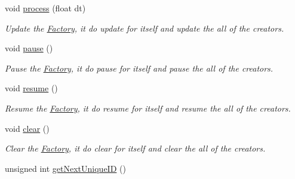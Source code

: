 \begin{DoxyCompactItemize}
\item 
void \hyperlink{class_magnum_1_1_entity_1_1_factory_a274df9f8d7d6f532cbd510a93b5a8445}{process} (float dt)
\begin{DoxyCompactList}\small\item\em Update the \hyperlink{class_magnum_1_1_entity_1_1_factory}{Factory}, it do update for itself and update the all of the creators. \end{DoxyCompactList}\item 
void \hyperlink{class_magnum_1_1_entity_1_1_factory_a5800621a1cfcab4ab08d837bec711e5a}{pause} ()\hypertarget{class_magnum_1_1_entity_1_1_factory_a5800621a1cfcab4ab08d837bec711e5a}{}\label{class_magnum_1_1_entity_1_1_factory_a5800621a1cfcab4ab08d837bec711e5a}

\begin{DoxyCompactList}\small\item\em Pause the \hyperlink{class_magnum_1_1_entity_1_1_factory}{Factory}, it do pause for itself and pause the all of the creators. \end{DoxyCompactList}\item 
void \hyperlink{class_magnum_1_1_entity_1_1_factory_aaca990e2fd0528031608ccc210488c9f}{resume} ()\hypertarget{class_magnum_1_1_entity_1_1_factory_aaca990e2fd0528031608ccc210488c9f}{}\label{class_magnum_1_1_entity_1_1_factory_aaca990e2fd0528031608ccc210488c9f}

\begin{DoxyCompactList}\small\item\em Resume the \hyperlink{class_magnum_1_1_entity_1_1_factory}{Factory}, it do resume for itself and resume the all of the creators. \end{DoxyCompactList}\item 
void \hyperlink{class_magnum_1_1_entity_1_1_factory_abfb492475d0e7b95875e7e1b2d4b5663}{clear} ()\hypertarget{class_magnum_1_1_entity_1_1_factory_abfb492475d0e7b95875e7e1b2d4b5663}{}\label{class_magnum_1_1_entity_1_1_factory_abfb492475d0e7b95875e7e1b2d4b5663}

\begin{DoxyCompactList}\small\item\em Clear the \hyperlink{class_magnum_1_1_entity_1_1_factory}{Factory}, it do clear for itself and clear the all of the creators. \end{DoxyCompactList}\item 
unsigned int \hyperlink{class_magnum_1_1_entity_1_1_factory_a7dcca4c85458ca892bb77a2206c2517a}{get\+Next\+Unique\+ID} ()\hypertarget{class_magnum_1_1_entity_1_1_factory_a7dcca4c85458ca892bb77a2206c2517a}{}\label{class_magnum_1_1_entity_1_1_factory_a7dcca4c85458ca892bb77a2206c2517a}


\end{DoxyCompactItemize}
